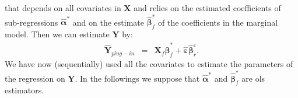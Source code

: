 \documentclass[12pt,a4paper]{report}
\begin{document}
that depends on all covariates in $\boldsymbol{X}$ and relies on the estimated coefficients of sub-regressions $\hat{\boldsymbol{\alpha}}^*$ and on the estimate $\hat{\boldsymbol{\beta}}_f^*$ of the coefficients in the marginal model.
Then we can estimate $\boldsymbol{Y}$ by:
\begin{eqnarray}
	\hat{\boldsymbol{Y}}_{plug-in}&=&\boldsymbol{X}_f\hat{\boldsymbol{\beta}}^*_f + \hat{\boldsymbol{\varepsilon}}\hat{\boldsymbol{\beta}}_{r}^{\varepsilon}. \label{hatYplugin} 
\end{eqnarray}
 We have now (sequentially) used all the covariates to estimate the parameters of the regression on $\boldsymbol{Y}$. 	In the followings we suppose that $\hat{\boldsymbol{\alpha}}^*$ and $\hat{\boldsymbol{\beta}}_f^*$ are {\sc ols} estimators. 
\\
\end{document}
